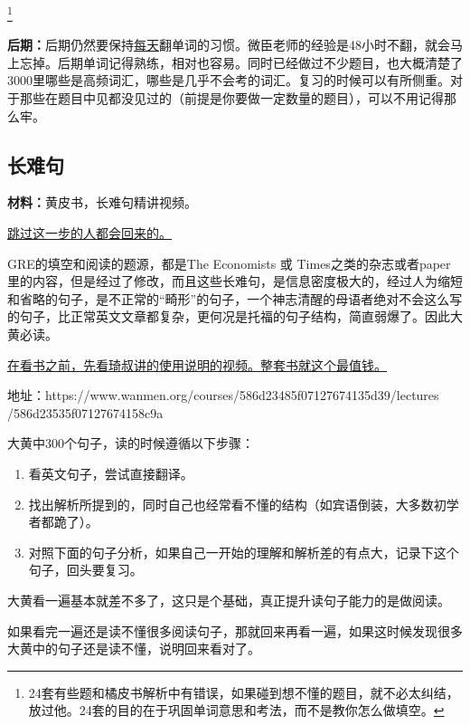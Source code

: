 \documentclass[cn,plain]{./src/qyxfbook}
\newenvironment{material}{\begin{tcolorbox}[title={材料}]}{\end{tcolorbox}}
\newcommand{\red}[1]{\textcolor[rgb]{1,0,0}{#1}}
\begin{document}
				\footnote{24套有些题和橘皮书解析中有错误，如果碰到想不懂的题目，就不必太纠结，放过他。24套的目的在于巩固单词意思和考法，而不是教你怎么做填空。}
				
				\textbf{后期：}后期仍然要保持\red{\underline{每天}}翻单词的习惯。微臣老师的经验是48小时不翻，就会马上忘掉。后期单词记得熟练，相对也容易。同时已经做过不少题目，也大概清楚了3000里哪些是高频词汇，哪些是几乎不会考的词汇。复习的时候可以有所侧重。对于那些在题目中见都没见过的（前提是你要做一定数量的题目），可以不用记得那么牢。
				
			
			
			\subsection{长难句}
				\begin{material}
				\textbf{材料：}黄皮书，长难句精讲视频。

			\end{material}
		
				\underline{跳过这一步的人都会回来的。}

				
				GRE的填空和阅读的题源，都是The Economists 或 Times之类的杂志或者paper里的内容，但是经过了修改，而且这些长难句，是信息密度极大的，经过人为缩短和省略的句子，是不正常的“畸形”的句子，一个神志清醒的母语者绝对不会这么写的句子，比正常英文文章都复杂，更何况是托福的句子结构，简直弱爆了。因此大黄必读。

				
				\underline{在看书之前，先看琦叔讲的使用说明的视频。整套书就这个最值钱。}\par
				地址：https://www.wanmen.org/courses/586d23485f07127674135d39/lectures\\/586d23535f07127674158c9a

				
				大黄中300个句子，读的时候遵循以下步骤：\par
					\begin{enumerate}
				\item 看英文句子，尝试直接翻译。\par
				\item 找出解析所提到的，同时自己也经常看不懂的结构（如宾语倒装，大多数初学者都跪了）。\par
				\item 对照下面的句子分析，如果自己一开始的理解和解析差的有点大，记录下这个句子，回头要复习。
\end{enumerate}
				
				大黄看一遍基本就差不多了，这只是个基础，真正提升读句子能力的是做阅读。\par
				如果看完一遍还是读不懂很多阅读句子，那就回来再看一遍，如果这时候发现很多大黄中的句子还是读不懂，说明回来看对了。
			
\end{document}
